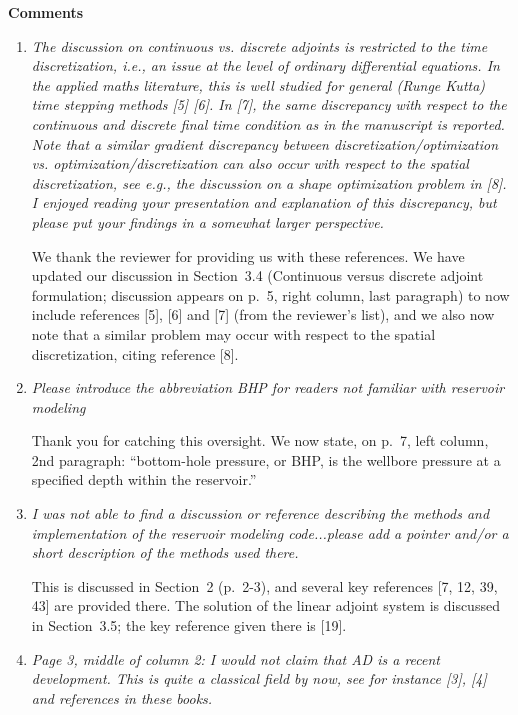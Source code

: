 \documentclass{article}
\begin{document}
\vspace{10pt}

   {\bf Comments}

   \begin{enumerate}
   \item {\it  The discussion on continuous vs. discrete adjoints is restricted to
   the time discretization, i.e., an issue at the level of ordinary
   differential equations. In the applied maths literature, this is well
   studied for general (Runge Kutta) time stepping methods [5] [6]. In
   [7], the same discrepancy with respect to the continuous and discrete
   final time condition as in the manuscript is reported.  Note that a
   similar gradient discrepancy between discretization/optimization
   vs. optimization/discretization can also occur with respect to the
   spatial discretization, see e.g., the discussion on a shape
   optimization problem in [8]. I enjoyed reading your presentation and
   explanation of this discrepancy, but please put your findings in a
   somewhat larger perspective.}
   

   We thank the reviewer for providing us with these references. We have updated our discussion in Section~3.4 (Continuous versus discrete adjoint formulation; discussion appears on p.~5, right column, last paragraph) to now include references [5], [6] and [7] (from the reviewer's list), and we also now note that a similar problem may occur with respect to the spatial discretization, citing reference [8].
  
   \item {\it 
   Please introduce the abbreviation BHP for readers not familiar with
   reservoir modeling}
   
Thank you for catching this oversight. We now state, on p.~7, left column, 2nd paragraph: ``bottom-hole pressure, or BHP, is the wellbore pressure at a specified depth within the reservoir.''   

   
      \item
   {\it I was not able to find a discussion or reference describing the
   methods and implementation of the reservoir modeling code...please
   add a pointer and/or a short description of the methods used there.}
   
This is discussed in Section~2 (p.~2-3), and several key references [7, 12, 39, 43] are provided there. The solution of the linear adjoint system is discussed in Section~3.5; the key reference given there is [19].

   \item {\it
   Page 3, middle of column 2: I would not claim that AD is a recent
   development. This is quite a classical field by now, see for instance
   [3], [4] and references in these books.}
   

\end{enumerate}
\end{document}
